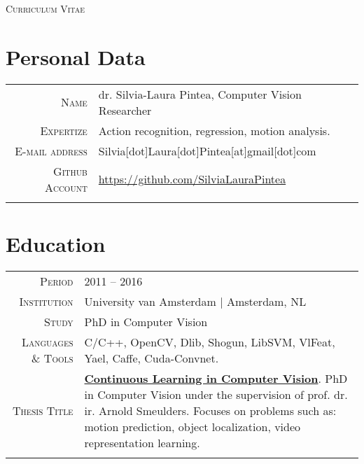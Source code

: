 \documentclass[a4paper, oneside, final]{scrartcl}
\newcommand{\gray}{\rowcolor[gray]{.90}}
\begin{document}
	\fontsize{9px}{11px}\selectfont
	\pagestyle{empty} %
	\begin{center} 
	\textsc{\Large\textsc{Curriculum Vitae}}
		\section{Personal Data}
		\begin{tabular}{r@{\hskip 0.3in}p{11.3cm}}
			\textsc{Name}            & dr. Silvia-Laura Pintea, Computer Vision Researcher\\
			\textsc{Expertize}	     & Action recognition, regression, motion analysis.\\
			\textsc{E-mail address}  & Silvia[dot]Laura[dot]Pintea[at]gmail[dot]com\\
			\textsc{Github Account}  & \href{https://github.com/SilviaLauraPintea}{https://github.com/SilviaLauraPintea}\\	
			\multicolumn{2}{c}{}\\ 
		\end{tabular}
		\section{Education}
		\begin{tabular}{r@{\hskip 0.3in}p{11.3cm}}
			\gray \textsc{Period}        & \textsc{2011 -- 2016}\\
			\textsc{Institution}         & University van Amsterdam $\mid$ Amsterdam, NL\\
			\textsc{Study}               & PhD in Computer Vision\\
			\textsc{Languages \& Tools}  & C\slash C++, OpenCV, Dlib, Shogun, LibSVM, VlFeat, Yael, Caffe, Cuda-Convnet.\\
			\textsc{Thesis Title}        & \textbf{\href{http://dare.uva.nl/search?identifier=90ad88f5-c16e-4450-86f2-23faa250fcab}{Continuous Learning in Computer Vision}}. 
				PhD in Computer Vision under the supervision of prof. dr. ir. Arnold Smeulders. 
				Focuses on problems such as: motion prediction, object localization, video representation learning.\\
			\multicolumn{2}{c}{}\\


\end{tabular}
\end{center}
\end{document}
